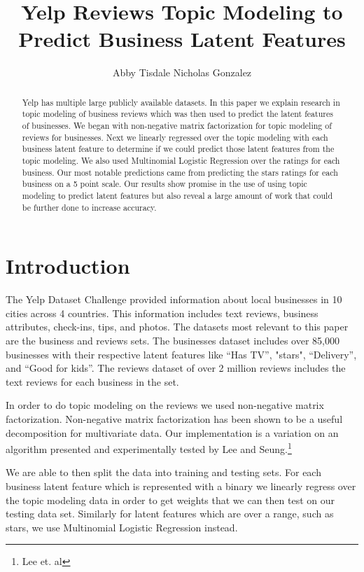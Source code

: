 \documentclass{article}
\title{Yelp Reviews Topic Modeling to Predict Business Latent Features}
\author{Abby Tisdale \And Nicholas Gonzalez}
\begin{document}
\maketitle

\begin{abstract}
  Yelp has multiple large publicly available datasets.  In this paper we explain research in topic modeling of business reviews which was then used to predict the latent features of businesses.  We began with non-negative matrix factorization for topic modeling of reviews for businesses.  Next we linearly regressed over the topic modeling with each business latent feature to determine if we could predict those latent features from the topic modeling.  We also used Multinomial Logistic Regression over the ratings for each business.  Our most notable predictions came from predicting the stars ratings for each business on a 5 point scale.  Our results show promise in the use of using topic modeling to predict latent features but also reveal a large amount of work that could be further done to increase accuracy.
\end{abstract}

\section{Introduction}


The Yelp Dataset Challenge provided information about local businesses in 10 cities across 4 countries.  This information includes text reviews, business attributes, check-ins, tips, and photos.  The datasets most relevant to this paper are the business and reviews sets.  The businesses dataset includes over 85,000 businesses with their respective latent features like “Has TV”, "stars", “Delivery”, and “Good for kids”.  The reviews dataset of over 2 million reviews includes the text reviews for each business in the set. 


In order to do topic modeling on the reviews we used non-negative matrix factorization.  Non-negative matrix factorization has been shown to be a useful decomposition for multivariate data.  Our implementation is a variation on an algorithm presented and experimentally tested by Lee and Seung.\footnote{Lee et. al}


We are able to then split the data into training and testing sets.  For each business latent feature which is represented with a binary we linearly regress over the topic modeling data in order to get weights that we can then test on our testing data set.  Similarly for latent features which are over a range, such as stars, we use Multinomial Logistic Regression instead.
\end{document}
